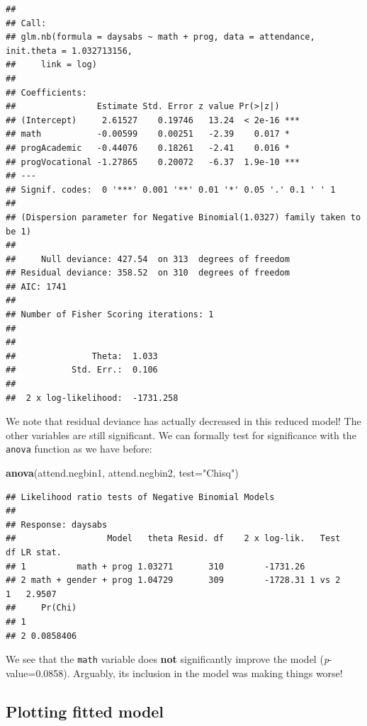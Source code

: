 \documentclass[
]{book}
\newenvironment{Shaded}{\begin{snugshade}}{\end{snugshade}}
\newcommand{\AttributeTok}[1]{\textcolor[rgb]{0.13,0.29,0.53}{#1}}
\newcommand{\FunctionTok}[1]{\textcolor[rgb]{0.13,0.29,0.53}{\textbf{#1}}}
\newcommand{\NormalTok}[1]{#1}
\newcommand{\StringTok}[1]{\textcolor[rgb]{0.31,0.60,0.02}{#1}}
\begin{document}
\begin{verbatim}
## 
## Call:
## glm.nb(formula = daysabs ~ math + prog, data = attendance, init.theta = 1.032713156, 
##     link = log)
## 
## Coefficients:
##                Estimate Std. Error z value Pr(>|z|)    
## (Intercept)     2.61527    0.19746   13.24  < 2e-16 ***
## math           -0.00599    0.00251   -2.39    0.017 *  
## progAcademic   -0.44076    0.18261   -2.41    0.016 *  
## progVocational -1.27865    0.20072   -6.37  1.9e-10 ***
## ---
## Signif. codes:  0 '***' 0.001 '**' 0.01 '*' 0.05 '.' 0.1 ' ' 1
## 
## (Dispersion parameter for Negative Binomial(1.0327) family taken to be 1)
## 
##     Null deviance: 427.54  on 313  degrees of freedom
## Residual deviance: 358.52  on 310  degrees of freedom
## AIC: 1741
## 
## Number of Fisher Scoring iterations: 1
## 
## 
##               Theta:  1.033 
##           Std. Err.:  0.106 
## 
##  2 x log-likelihood:  -1731.258
\end{verbatim}

We note that residual deviance has actually decreased in this reduced model! The other variables are still significant. We can formally test for significance with the \texttt{anova} function as we have before:

\begin{Shaded}
\begin{Highlighting}[]
\FunctionTok{anova}\NormalTok{(attend.negbin1, attend.negbin2, }\AttributeTok{test=}\StringTok{"Chisq"}\NormalTok{)}
\end{Highlighting}
\end{Shaded}

\begin{verbatim}
## Likelihood ratio tests of Negative Binomial Models
## 
## Response: daysabs
##                  Model   theta Resid. df    2 x log-lik.   Test    df LR stat.
## 1          math + prog 1.03271       310        -1731.26                      
## 2 math + gender + prog 1.04729       309        -1728.31 1 vs 2     1   2.9507
##     Pr(Chi)
## 1          
## 2 0.0858406
\end{verbatim}

We see that the \texttt{math} variable does \textbf{not} significantly improve the model (\emph{p}-value=0.0858). Arguably, its inclusion in the model was making things worse!

\hypertarget{plotting-fitted-model}{%
\subsection{Plotting fitted model}\label{plotting-fitted-model}}
\end{document}
